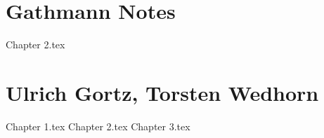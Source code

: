 \documentclass{book}
\begin{document}
\newpage\part{Gathmann Notes}
{Chapter 2.tex}

\newpage\part{Ulrich Gortz, Torsten Wedhorn}
{Chapter 1.tex}
{Chapter 2.tex}
{Chapter 3.tex}

\newpage


\end{document}
